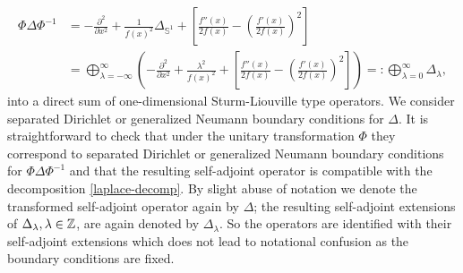 \begin{equation}
\label{laplace-decomp}
\begin{split}
\Phi \Delta \Phi^{-1} &= -\frac{\partial^2}{\partial x^2} + \frac{1}{f(x)^2} \Delta_{\mathbb{S}^1} 
+ \left[\frac{f''(x)}{2f(x)} - \left(\frac{f'(x)}{2f(x)}\right)^2\right] \\
&=\bigoplus_{\lambda = -\infty}^{\infty} \left( -\frac{\partial^2}{\partial x^2} + \frac{\lambda^2}{f(x)^2} 
+ \left[\frac{f''(x)}{2f(x)} - \left(\frac{f'(x)}{2f(x)}\right)^2\right]\right)
=: \bigoplus_{\lambda=0}^{\infty} \Delta_\lambda,
\end{split}
\end{equation}
into a direct sum of one-dimensional Sturm-Liouville type operators.
We consider separated Dirichlet or generalized Neumann boundary conditions for 
$\Delta$. It is straightforward to check that under the unitary transformation 
$\Phi$ they correspond to separated Dirichlet or generalized Neumann 
boundary conditions for $\Phi \Delta \Phi^{-1}$ and that the resulting self-adjoint operator is compatible with the 
decomposition \eqref{laplace-decomp}. By slight abuse of notation
we denote the transformed self-adjoint operator again by $\Delta$;
the resulting self-adjoint extensions of $\Delta_\lambda, \lambda\in \mathbb{Z}$,
are again denoted by $\Delta_\lambda$. So the operators are 
identified with their self-adjoint extensions which does not lead to 
notational confusion as the boundary conditions are fixed.


